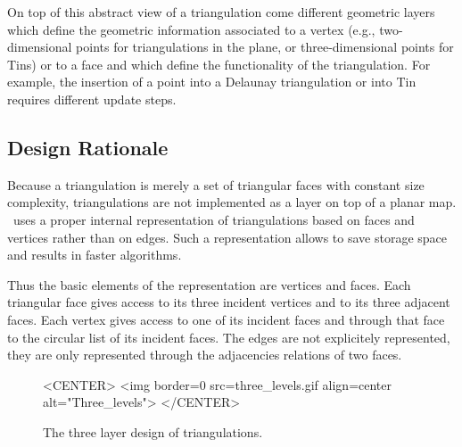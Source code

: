 On top of this  abstract  view of a triangulation come different
geometric layers which define  the geometric information
associated to a vertex (e.g.,  two-dimensional points for triangulations
in the plane, or three-dimensional points for {\sc Tin}s) or to a face
and which define the functionality of the triangulation. 
For example, the insertion of a point into a Delaunay
triangulation or into  {\sc Tin} requires different update steps.


\subsection*{Design Rationale}
Because a triangulation is merely a set of
triangular faces with constant size complexity,
triangulations are not implemented
as a layer on top of a planar map.
\cgal\ uses a proper internal
representation of triangulations based on faces and vertices
rather than on edges. Such a representation
allows to save storage space and results in faster
algorithms.

Thus the basic elements of the representation are vertices and faces.
Each triangular face gives access to its three incident vertices 
and to its three adjacent faces. 
Each vertex gives access to one of its incident faces
and through that face to the circular list of its incident faces.
The edges are not explicitely represented, they are only represented 
through the adjacencies relations of two faces.


\begin{figure}
\begin{ccTexOnly}
\begin{center}

\end{center}
\end{ccTexOnly}
\caption{The three layer design of triangulations.
\label{I1_Fig_three_levels}}
\begin{ccHtmlOnly}
<CENTER>
<img border=0 src=three_levels.gif align=center alt="Three_levels">
</CENTER>
\end{ccHtmlOnly}
\end{figure}



